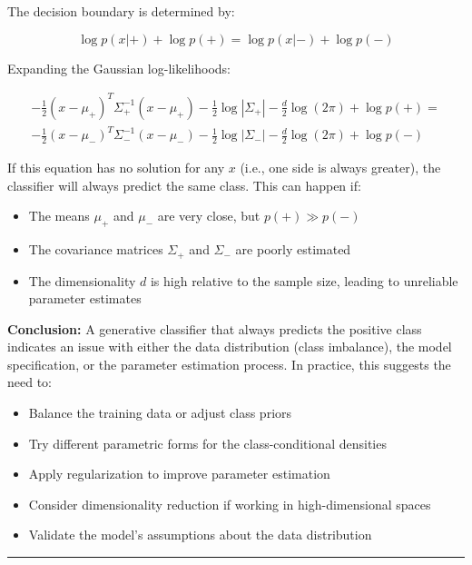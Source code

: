 \documentclass{article}
\begin{document}
\parbox{\textwidth}{The decision boundary is determined by:}

$$\log p(x|+) + \log p(+) = \log p(x|-) + \log p(-)$$

\parbox{\textwidth}{Expanding the Gaussian log-likelihoods:}

\begin{align*}
-\frac{1}{2}(x-\mu_+)^T\Sigma_+^{-1}(x-\mu_+) - \frac{1}{2}\log|\Sigma_+| - \frac{d}{2}\log(2\pi) + \log p(+) = \\
-\frac{1}{2}(x-\mu_-)^T\Sigma_-^{-1}(x-\mu_-) - \frac{1}{2}\log|\Sigma_-| - \frac{d}{2}\log(2\pi) + \log p(-)
\end{align*}

\parbox{\textwidth}{If this equation has no solution for any $x$ (i.e., one side is always greater), the classifier will always predict the same class. This can happen if:}

\begin{itemize}
    \item The means $\mu_+$ and $\mu_-$ are very close, but $p(+) \gg p(-)$
    \item The covariance matrices $\Sigma_+$ and $\Sigma_-$ are poorly estimated
    \item The dimensionality $d$ is high relative to the sample size, leading to unreliable parameter estimates
\end{itemize}

\vspace{0.3cm}

\parbox{\textwidth}{\textbf{Conclusion:} A generative classifier that always predicts the positive class indicates an issue with either the data distribution (class imbalance), the model specification, or the parameter estimation process. In practice, this suggests the need to:}

\begin{itemize}
    \item Balance the training data or adjust class priors
    \item Try different parametric forms for the class-conditional densities
    \item Apply regularization to improve parameter estimation
    \item Consider dimensionality reduction if working in high-dimensional spaces
    \item Validate the model's assumptions about the data distribution
\end{itemize}


\noindent\rule{\textwidth}{0.4pt}\\
\end{document}
